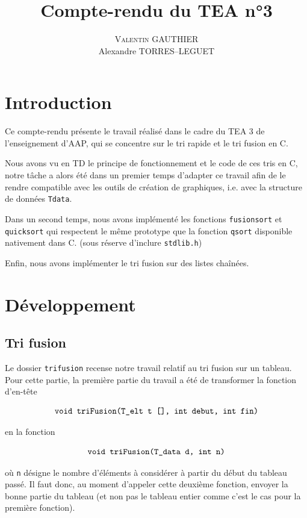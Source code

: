 \documentclass[11pt]{article}
\title{Compte-rendu du TEA n°3}
\author{\textsc{Valentin GAUTHIER}\\ Alexandre TORRES--LEGUET}
\begin{document}
\maketitle

\section{Introduction}

\quad \quad Ce compte-rendu présente le travail réalisé dans le cadre du TEA 3 de l'enseignement d'AAP, qui se concentre sur le tri rapide et le tri fusion en \textsc{C}.
 
Nous avons vu en TD le principe de fonctionnement et le code de ces tris en \textsc{C}, notre tâche a alors été dans un premier temps d'adapter ce travail afin de le rendre compatible avec les outils de création de graphiques, i.e. avec la structure de données \texttt{T\textunderscore data}. 

Dans un second temps, nous avons implémenté les fonctions \texttt{fusionsort} et \texttt{quicksort} qui respectent le même prototype que la fonction \texttt{qsort} disponible nativement dans \textsc{C}. (sous réserve d'inclure \texttt{stdlib.h})

Enfin, nous avons implémenter le tri fusion sur des listes chaînées.

\section{Développement}

\subsection{Tri fusion}

\quad \quad Le dossier \texttt{tri\textunderscore fusion} recense notre travail relatif au tri fusion sur un tableau. \\

Pour cette partie, la première partie du travail a été de transformer la fonction d'en-tête

$$
\texttt{void triFusion(T\textunderscore elt t [], int debut, int fin)}
$$

en la fonction

$$
\texttt{void triFusion(T\textunderscore data d, int n)}
$$

où \texttt{n} désigne le nombre d'éléments à considérer à partir du début du tableau passé. Il faut donc, au moment d'appeler cette deuxième fonction, envoyer la bonne partie du tableau (et non pas le tableau entier comme c'est le cas pour la première fonction). \\
\end{document}
